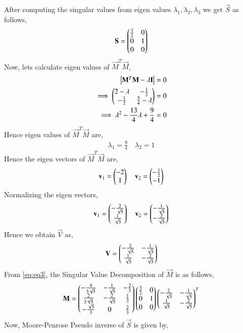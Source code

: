 \documentclass[journal,12pt,twocolumn]{IEEEtran}
\begin{document}
After computing the singular values from eigen values $\lambda_1, \lambda_2, \lambda_3$ we get $\vec{S}$ as follows,
\begin{align}
\mathbf{S}=\begin{pmatrix}\frac{3}{2}&0\\0&1\\0&0\end{pmatrix}
\end{align}
Now, lets calculate eigen values of $\vec{M}^T\vec{M}$,
\begin{align}
\begin{vmatrix}\mathbf{M}^T\mathbf{M} - \lambda\mathbf{I}\end{vmatrix} &= 0\\
\implies\begin{pmatrix}2-\lambda&-\frac{1}{2}\\-\frac{1}{2}&\frac{5}{4}-\lambda\end{pmatrix} &=0\\
\implies\lambda^2-\frac{13}{4}\lambda+\frac{9}{4} &=0
\end{align}
Hence eigen values of $\vec{M}^T\vec{M}$ are,
\begin{align}
\lambda_1 = \frac{9}{4}\quad
\lambda_2 = 1
\end{align}
Hence the eigen vectors of $\vec{M}^T\vec{M}$ are,
\begin{align}
\mathbf{v}_1=\begin{pmatrix}-2\\1\end{pmatrix} \quad
\mathbf{v}_2=\begin{pmatrix}-\frac{1}{2}\\-1\end{pmatrix}
\end{align}
Normalizing the eigen vectors,
\begin{align}
\mathbf{v}_1=\begin{pmatrix}-\frac{2}{\sqrt{5}}\\\frac{1}{\sqrt{5}}\end{pmatrix} \quad
\mathbf{v}_2=\begin{pmatrix}-\frac{1}{\sqrt{5}}\\-\frac{2}{\sqrt{5}}\end{pmatrix}
\end{align}
Hence we obtain $\vec{V}$ as,
\begin{align}
\mathbf{V}=\begin{pmatrix}-\frac{2}{\sqrt{5}}&-\frac{1}{\sqrt{5}}\\\frac{1}{\sqrt{5}}&-\frac{2}{\sqrt{5}}\end{pmatrix}
\end{align}
From \eqref{eq:eq3}, the Singular Value Decomposition of $\vec{M}$ is as follows,
\begin{align}
\mathbf{M} = \begin{pmatrix}-\frac{4}{3\sqrt{5}}&-\frac{1}{\sqrt{5}}&-\frac{2}{3}\\\frac{2}{3\sqrt{5}}&-\frac{2}{\sqrt{5}}&\frac{1}{3}\\-\frac{\sqrt{5}}{3}&0&\frac{2}{3}\end{pmatrix}\begin{pmatrix}\frac{3}{2}&0\\0&1\\0&0\end{pmatrix}\begin{pmatrix}-\frac{2}{\sqrt{5}}&-\frac{1}{\sqrt{5}}\\\frac{1}{\sqrt{5}}&-\frac{2}{\sqrt{5}}\end{pmatrix}^T
\end{align}
Now, Moore-Penrose Pseudo inverse of $\vec{S}$ is given by,
\end{document}
